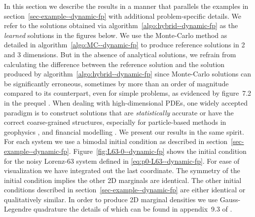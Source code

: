In this section we describe the results in a manner that parallels the examples in section~\ref{sec-example--dynamic-fp} with additional problem-specific details. We refer to the solutions obtained via algorithm~\ref{algo:hybrid--dynamic-fp} as the \textit{learned} solutions in the figures below. We use the Monte-Carlo method as detailed in algorithm~\ref{algo:MC--dynamic-fp} to produce reference solutions in 2 and 3 dimensions. But in the absence of analytical solutions, we refrain from calculating the difference between the reference solution and the solution produced by algorithm~\ref{algo:hybrid--dynamic-fp} since Monte-Carlo solutions can be significantly erroneous, sometimes by more than an order of magnitude compared to its counterpart, even for simple problems, as evidenced by figure~7.2 in the prequel \cite{mandal2023learning}. When dealing with high-dimensional PDEs, one widely accepted paradigm is to construct solutions that are \textit{statistically} accurate or have the correct coarse-grained structures, especially for particle-based methods in geophysics \cite{bosler2013particle}, \cite{chen2018efficient} and financial modelling \cite{cui2015particle}. We present our results in the same spirit. For each system we use a bimodal initial condition as described in section~\ref{sec-example--dynamic-fp}. Figure~\ref{fig:L63-0--dynamic-fp} shows the initial condition for the noisy Lorenz-63 system defined in \eqref{eq:p0-L63--dynamic-fp}. For ease of visualization we have integrated out the last coordinate. The symmetry of the initial condition implies the other 2D marginals are identical. The other initial conditions described in section~\ref{sec-example--dynamic-fp} are either identical or qualitatively similar. In order to produce 2D marginal densities we use Gauss-Legendre quadrature the details of which can be found in appendix~9.3 of \cite{mandal2023learning}.
